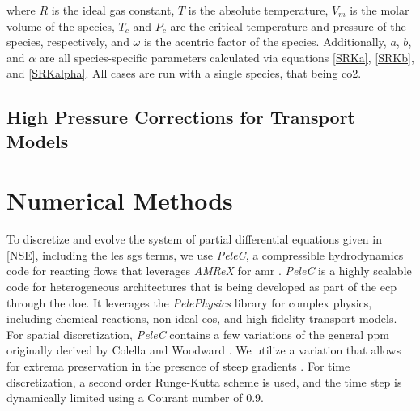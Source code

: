 where $R$ is the ideal gas constant, $T$ is the absolute temperature, $V_m$ is the molar volume of the species, $T_c$ and $P_c$ are the critical temperature and pressure of the species, respectively, and $\omega$ is the acentric factor of the species. Additionally, $a$, $b$, and $\alpha$ are all species-specific parameters calculated via equations \ref{SRKa}, \ref{SRKb}, and \ref{SRKalpha}. All cases are run with a single species, that being \gls{co2}. 

\subsection{High Pressure Corrections for Transport Models}

\section{Numerical Methods}
To discretize and evolve the system of partial differential equations given in \ref{NSE}, including the \gls{les} \gls{sgs} terms, we use \textit{PeleC}, a compressible hydrodynamics code for reacting flows that leverages \textit{AMReX} for \gls{amr} \cite{}. \textit{PeleC} is a highly scalable code for heterogeneous architectures that is being developed as part of the \gls{ecp} through the \gls{doe}. It leverages the \textit{PelePhysics} library for complex physics, including chemical reactions, non-ideal \gls{eos}, and high fidelity transport models. For spatial discretization, \textit{PeleC} contains a few variations of the general \gls{ppm} originally derived by Colella and Woodward \cite{1984JCoPPPM}. We utilize a variation that allows for extrema preservation in the presence of steep gradients \cite{MILLER200226, COLELLA20087069}. For time discretization, a second order Runge-Kutta scheme is used, and the time step is dynamically limited using a Courant number of 0.9. 

